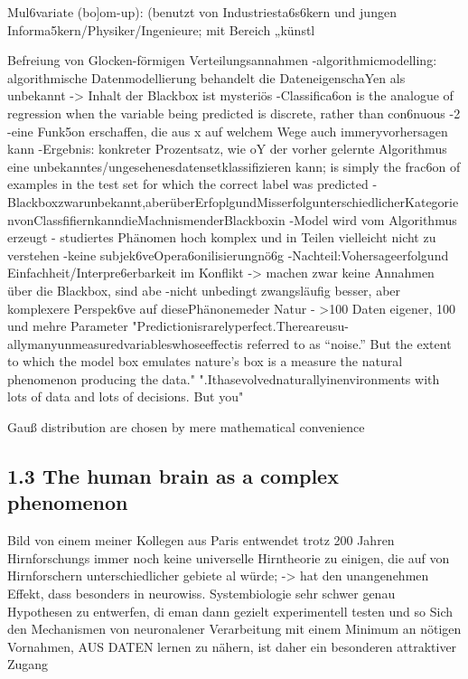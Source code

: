 \documentclass[authoryear,review,3p]{elsarticle}
\begin{document}
Mul6variate (bo]om-up): (benutzt von Industriesta6s6kern und jungen Informa5kern/Physiker/Ingenieure; mit Bereich „künstl

Befreiung von Glocken-förmigen Verteilungsannahmen
-algorithmicmodelling: algorithmische Datenmodellierung behandelt die DateneigenschaYen als unbekannt -> Inhalt der Blackbox ist mysteriös
-Classifica6on is the analogue of regression when the variable being predicted is discrete, rather than con6nuous
-2%
-eine Funk5on erschaffen, die aus x auf welchem Wege auch immeryvorhersagen kann
-Ergebnis: konkreter Prozentsatz, wie oY der vorher gelernte Algorithmus eine unbekanntes/ungesehenesdatensetklassifizieren kann; is simply the frac6on of examples in the test set for which the correct label was predicted -Blackboxzwarunbekannt,aberüberErfoplgundMisserfolgunterschiedlicherKategorienvonClassfifiernkanndieMachnismenderBlackboxin -Model wird vom Algorithmus erzeugt
- studiertes Phänomen hoch komplex und in Teilen vielleicht nicht zu verstehen
-keine subjek6veOpera6onilisierungnö6g
-Nachteil:Vohersageerfolgund Einfachheit/Interpre6erbarkeit im Konflikt -> machen zwar keine Annahmen über die Blackbox, sind abe -nicht unbedingt zwangsläufig besser, aber komplexere Perspek6ve auf diesePhänonemeder Natur
- >100 Daten eigener, 100 und mehre Parameter
"Predictionisrarelyperfect.Thereareusu- allymanyunmeasuredvariableswhoseeffectis referred to as “noise.” But the extent to which the model box emulates nature’s box is a measure the natural phenomenon producing the data."
".Ithasevolvednaturallyinenvironments with lots of data and lots of decisions. But you"


Gauß distribution are chosen by mere mathematical convenience





\subsection*{1.3 The human brain as a complex phenomenon}


Bild von einem meiner Kollegen aus Paris entwendet
trotz 200 Jahren Hirnforschungs immer noch keine universelle Hirntheorie zu einigen, die auf von Hirnforschern unterschiedlicher gebiete al würde;
-> hat den unangenehmen Effekt, dass besonders in neurowiss. Systembiologie sehr schwer genau Hypothesen zu entwerfen, di eman dann gezielt experimentell testen und so
Sich den Mechanismen von neuronalener Verarbeitung mit einem Minimum an nötigen Vornahmen, AUS DATEN lernen zu nähern, ist daher ein besonderen attraktiver Zugang
\end{document}
